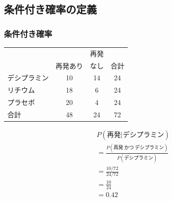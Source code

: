 
\subsection{条件付き確率の定義}


\begin{frame}[shrink=10]
\frametitle{条件付き確率}


{
{\small
\begin{center}
\begin{tabular}{l | c c | c}
			& 		& 再発 		&  \\
			& 再発あり	& なし	& 合計 \\
\hline
デシプラミン	& 10		& 14		& 24 \\
リチウム		& 18		& 6		& 24 \\
プラセボ		& 20		& 4		& 24  \\
\hline
合計			& 48		& 24		&  72
\end{tabular}
\end{center}
}
}
{
\begin{eqnarray*}
&&P(\text{再発} |  \text{デシプラミン}) \\
&&= \frac{P(\text{再発} ~ \text{かつ} ~ \text{デシプラミン})}{P(\text{デシプラミン})} \\
&&= \frac{10 / 72}{24 / 72} \\
&&= \frac{10}{24} \\
&&= 0.42
\end{eqnarray*}
}

\end{frame}


